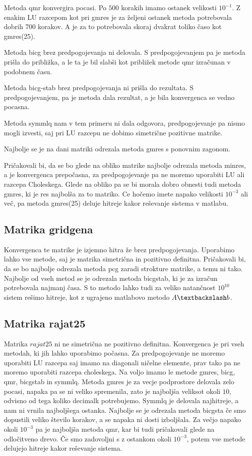 \documentclass[11pt]{article} %
\begin{document}
 Metoda qmr konvergira pocasi.  Po $500$ korakih imamo ostanek velikosti $10^{-1}$. Z enakim LU razcepom kot pri gmres je za željeni ostanek metoda potrebovala dobrih 700 korakov. A je za to potrebovala skoraj dvakrat toliko časo kot gmres(25).
 
 Metoda bicg brez predpogojevanja ni delovala. S predpogojevanjem pa je metoda prišla do približka, a le ta je bil slabši kot približek metode qmr izračunan v podobnem času.
 
Metoda bicg-stab brez predpogojevanja ni prišla do rezultata. S predpogojevanjem, pa je metoda dala rezultat, a je bila konvergenca se vedno pocasna.

Metoda symmlq nam v tem primeru ni dala odgovora, predpogojevanje pa nismo mogli izvesti, saj pri LU razcepu ne dobimo simetrične pozitivne matrike.

Najbolje se je na dani matriki odrezala metoda gmres s ponovnim zagonom.

Pričakovali bi, da se bo glede na obliko matrike najbolje odrezala metoda minres, a je konvergenca prepočasna, za predpogojevanje pa ne moremo uporabiti LU ali razcepa Choleskega. Glede na obliko pa se bi morala dobro obnesti tudi metoda gmres, ki je res najbolša za to matriko. Ce hočemo imete napako velikosti $10^{-3}$ ali več, pa metoda gmres(25) deluje hitreje kakor reševanje sistema v matlabu.

\subsection{Matrika gridgena}

Konvergenca te matrike je izjemno hitra že brez predpogojevanja. Uporabimo lahko vse metode, saj je matrika simetrična in pozitivno definitna. Pričakovali bi, da se bo najbolje odrezala metoda pcg zaradi strokture matrike, a temu ni tako. Najbolje od vseh metod se je odrezala metoda bicgstab, ki je za izračun potrebovala najmanj časa. S to metodo lahko tudi za veliko natančnost $10^{10}$ sistem rešimo hitreje, kot z ugrajeno matlabovo metodo $A\textbackslash b$.

\subsection{Matrika rajat25}

Matrika $rajat25$ ni ne simetrična ne pozitivno definitna. Konvergenca je pri vseh metodah, ki jih lahko uporabimo počasna. Za predpogojevanje ne moremo uporabiti LU razcepa saj imamo na diagonali ničelne elemente, prav tako pa ne moremo uporabiti razcepa choleskega.  Na voljo imamo le metode gmres, bicg, qmr, bicgstab in symmlq. Metoda gmres je za vecje podprostore delovala zelo pocasi, napaka pa se ni veliko spremenila, zato je najboljša veliksot okoli $10$, odvisno od tega koliko decimalk potrebujemo. Symmlq je delovala najhitreje, a nam ni vrnila najboljšega ostanka. Najbolje se je odrezala metoda bicgsta če smo dopustili veliko število korakov, a se napaka ni dosti izboljšala. Za večjo napako okoli $10^{-3}$ pa je najboljša metoda qmr, kar bi tudi pričakovali glede na odločitveno drevo. Če smo zadovoljni s z ostankom okoli $10^{-3}$, potem vse metode delujejo hitreje kakor reševanje sistema.
\end{document}
